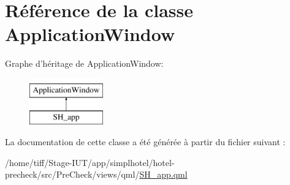 \hypertarget{classApplicationWindow}{\section{Référence de la classe Application\-Window}
\label{classApplicationWindow}
}
Graphe d'héritage de Application\-Window\-:\begin{figure}[H]
\begin{center}
\leavevmode
\includegraphics[height=2.000000cm]{classApplicationWindow}
\end{center}
\end{figure}


La documentation de cette classe a été générée à partir du fichier suivant \-:\begin{DoxyCompactItemize}
\item 
/home/tiff/\-Stage-\/\-I\-U\-T/app/simplhotel/hotel-\/precheck/src/\-Pre\-Check/views/qml/\hyperlink{SH__app_8qml}{S\-H\-\_\-app.\-qml}\end{DoxyCompactItemize}
